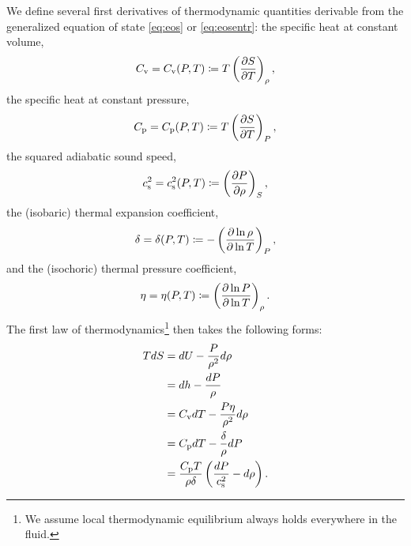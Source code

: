 \documentclass[12pt]{article}
\begin{document}
We define several first derivatives of thermodynamic quantities derivable from the generalized equation of state \eqref{eq:eos} or \eqref{eq:eosentr}: the specific heat at constant volume,
\begin{align}\label{eq:cv}
	C_{\rm{v}}=C_{\rm{v}}(P,T)\coloneqq T\left(\frac{\partial S}{\partial T}\right)_\rho,
\end{align}
the specific heat at constant pressure, 
\begin{align}\label{eq:cp}
	C_{\rm{p}}=C_{\rm{p}}(P,T)\coloneqq T\left(\frac{\partial S}{\partial T}\right)_P,
\end{align}
the squared adiabatic sound speed,
\begin{align}\label{eq:cs2}
	c_{\rm s}^2=c_{\rm s}^2(P,T)\coloneqq \left(\frac{\partial P}{\partial\rho}\right)_S,
\end{align}
the (isobaric) thermal expansion coefficient,
\begin{align}\label{eq:delta}
	\delta=\delta(P,T)\coloneqq-\left(\frac{\partial\ln\rho}{\partial\ln T}\right)_P,
\end{align}
and the (isochoric) thermal pressure coefficient, 
\begin{align}\label{eq:eta}
	\eta=\eta(P,T)\coloneqq\left(\frac{\partial\ln P}{\partial\ln T}\right)_\rho.
\end{align}
The first law of thermodynamics\footnote{We assume local thermodynamic equilibrium always holds everywhere in the fluid.} then takes the following forms:
\begin{subequations}\label{eq:firstlaw}
	\begin{align}
		TdS &= dU - \frac{P}{\rho^2}d\rho \label{eq:firstlawinterho} \\
		&= dh - \frac{dP}{\rho}\label{eq:firstlawenthprs}\\
		&= C_{\rm{v}} dT - \frac{P\eta}{\rho^2}d\rho\label{eq:firstlawtmprho}\\		
		&= C_{\rm{p}} dT - \frac{\delta}{\rho}dP\label{eq:firstlawtmpprs}\\
		&=\frac{C_{\rm{p}} T}{\rho\delta}\left(\frac{dP}{c_{\rm s}^2}-d\rho\right)\label{eq:firstlawprsrho}.
	\end{align}
\end{subequations}

	
\end{document}
